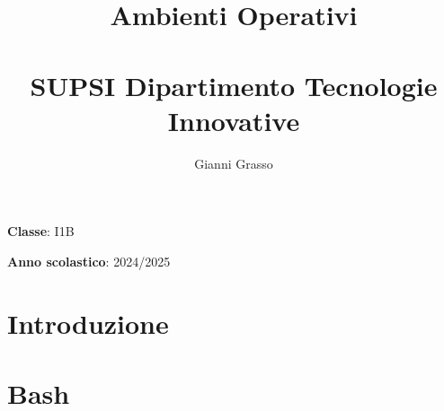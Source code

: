 \documentclass{article}
\title{
    Ambienti Operativi \\
    \phantom{}\\
    \large SUPSI Dipartimento Tecnologie Innovative
}
\author{Gianni Grasso}
\begin{document}
\maketitle
\hphantom{ }
\vspace{14.5cm}

\textbf{Classe}: I1B

\textbf{Anno scolastico}: 2024/2025
\pagebreak


\tableofcontents
\pagebreak

\section{Introduzione}

\pagebreak


\section{Bash}

\pagebreak

\end{document}
